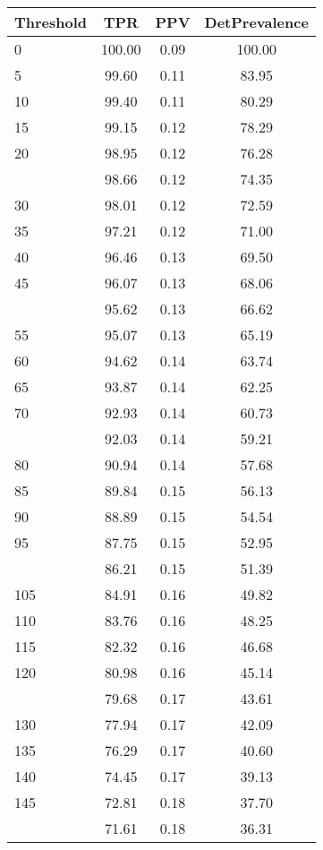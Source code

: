 \begin{table}[ht]
\centering
\begin{tabular}{lccc}
  \toprule
Threshold & TPR & PPV & DetPrevalence \\ 
  \midrule
0 & 100.00 & 0.09 & 100.00 \\ 
  5 & 99.60 & 0.11 & 83.95 \\ 
  10 & 99.40 & 0.11 & 80.29 \\ 
  15 & 99.15 & 0.12 & 78.29 \\ 
  20 & 98.95 & 0.12 & 76.28 \\ 
   \addlinespace
25 & 98.66 & 0.12 & 74.35 \\ 
  30 & 98.01 & 0.12 & 72.59 \\ 
  35 & 97.21 & 0.12 & 71.00 \\ 
  40 & 96.46 & 0.13 & 69.50 \\ 
  45 & 96.07 & 0.13 & 68.06 \\ 
   \addlinespace
50 & 95.62 & 0.13 & 66.62 \\ 
  55 & 95.07 & 0.13 & 65.19 \\ 
  60 & 94.62 & 0.14 & 63.74 \\ 
  65 & 93.87 & 0.14 & 62.25 \\ 
  70 & 92.93 & 0.14 & 60.73 \\ 
   \addlinespace
75 & 92.03 & 0.14 & 59.21 \\ 
  80 & 90.94 & 0.14 & 57.68 \\ 
  85 & 89.84 & 0.15 & 56.13 \\ 
  90 & 88.89 & 0.15 & 54.54 \\ 
  95 & 87.75 & 0.15 & 52.95 \\ 
   \addlinespace
100 & 86.21 & 0.15 & 51.39 \\ 
  105 & 84.91 & 0.16 & 49.82 \\ 
  110 & 83.76 & 0.16 & 48.25 \\ 
  115 & 82.32 & 0.16 & 46.68 \\ 
  120 & 80.98 & 0.16 & 45.14 \\ 
   \addlinespace
125 & 79.68 & 0.17 & 43.61 \\ 
  130 & 77.94 & 0.17 & 42.09 \\ 
  135 & 76.29 & 0.17 & 40.60 \\ 
  140 & 74.45 & 0.17 & 39.13 \\ 
  145 & 72.81 & 0.18 & 37.70 \\ 
   \addlinespace
150 & 71.61 & 0.18 & 36.31 \\ 

\end{tabular}
\end{table}
